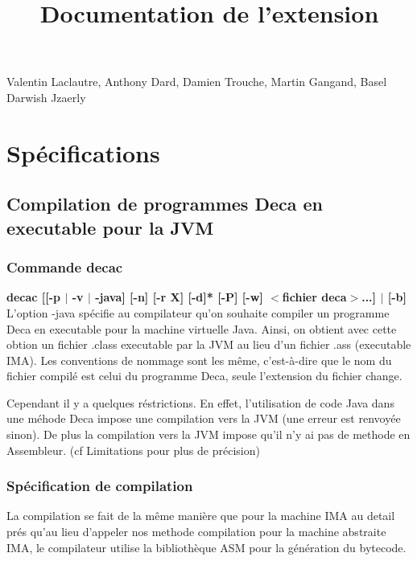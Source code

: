 \documentclass[12pt, a4paper, one side]{article}
\title{Documentation de l'extension}
\author{}
\date{}
\begin{document}
\maketitle

\begin{center}
    Valentin Laclautre, Anthony Dard, Damien Trouche, Martin Gangand, Basel Darwish Jzaerly
\end{center}

\tableofcontents

\section{Spécifications}
    \subsection{Compilation de programmes Deca en executable pour la JVM}
        \subsubsection{Commande decac}
        \textbf{decac [[-p $\mid$ -v $\mid$ -java] [-n] [-r X] [-d]* [-P] [-w] $<$fichier deca$>$...] $\mid$ [-b]}
        \\

        L'option -java spécifie au compilateur qu'on souhaite compiler un programme Deca en executable pour la machine virtuelle Java.
        Ainsi, on obtient avec cette obtion un fichier .class executable par la JVM au lieu d'un fichier .ass (executable IMA). Les conventions de nommage sont les même, c'est-à-dire que le nom du fichier compilé est celui du programme Deca, seule l'extension du fichier change.

        Cependant il y a quelques réstrictions. En effet, l'utilisation de code Java dans une méhode Deca impose une compilation vers la JVM (une erreur est renvoyée sinon). De plus la compilation vers la JVM impose qu'il n'y ai pas de methode en Assembleur. (cf Limitations pour plus de précision)

        \subsubsection{Spécification de compilation}
        La compilation se fait de la même manière que pour la machine IMA au detail prés qu'au lieu d'appeler nos methode compilation pour la machine abstraite IMA, le compilateur utilise la bibliothèque ASM\cite{ASM} pour la génération du bytecode.
\end{document}
